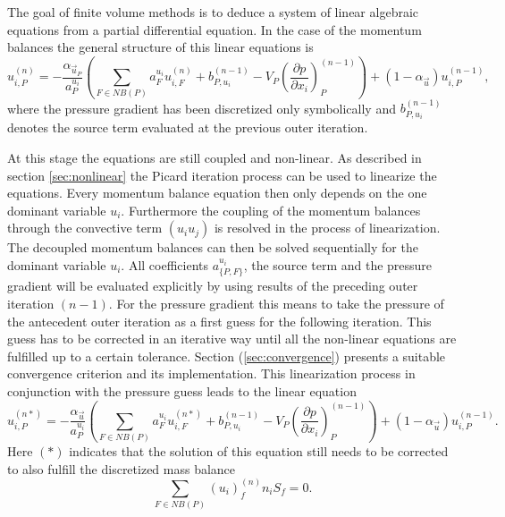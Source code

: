 The goal of finite volume methods is to deduce a system of linear algebraic equations from a partial differential equation. In the case of the momentum balances the general structure of this linear equations is
\begin{equation}
  \label{eq:linfinal}
  u_{i,P}^{(n)} 
  = 
  - \frac{\alpha_{\vec{u}_P}}{a_P^{u_i}} \left(\sum_{F \in NB(P)} a_F^{u_i} u_{i,F}^{(n)}
  +                                     b_{P,u_i}^{(n-1)} 
  -                                     V_P\left(\frac{\partial p}{\partial x_i}\right)_P^{(n-1)} \right)
  + \left(1 - \alpha_{\vec{u}}\right) u_{i,P}^{(n-1)},
\end{equation}
where the pressure gradient has been discretized only symbolically and \(b_{P,u_i}^{(n-1)}\) denotes the source term evaluated at the previous outer iteration.

At this stage the equations are still coupled and non-linear. As described in section \ref{sec:nonlinear} the Picard iteration process can be used to linearize the equations. Every momentum balance equation then only depends on the one dominant variable \(u_i\). Furthermore the coupling of the momentum balances through the convective term \((u_i u_j)\) is resolved in the process of linearization. The decoupled momentum balances can then be solved sequentially for the dominant variable \(u_i\). All coefficients \(a_{\{P,F\}}^{u_i}\), the source term and the pressure gradient will be evaluated explicitly by using results of the preceding outer iteration \((n-1)\). For the pressure gradient this means to take the pressure of the antecedent outer iteration as a first guess for the following iteration. This guess has to be corrected in an iterative way until all the non-linear equations are fulfilled up to a certain tolerance. Section (\ref{sec:convergence}) presents a suitable convergence criterion and its implementation. This linearization process in conjunction with the pressure guess leads to the linear equation 
\begin{equation}
  \label{eq:nodeinter}
  u_{i,P}^{(n*)} 
  = 
  - \frac{\alpha_{\vec{u}}}{a_P^{u_i}} \left(\sum_{F \in NB(P)} a_F^{u_i} u_{i,F}^{(n*)}
  +                                     b_{P,u_i}^{(n-1)} 
  -                                     V_P\left(\frac{\partial p}{\partial x_i}\right)_P^{(n-1)} \right)
  + \left(1 - \alpha_{\vec{u}}\right) u_{i,P}^{(n-1)}.
\end{equation}
Here \((*)\) indicates that the solution of this equation still needs to be corrected to also fulfill the discretized mass balance
\begin{equation}
  \label{eq:contisemi}
  \sum_{F \in NB(P)} (u_i)_f^{(n)} n_i S_f = 0.
\end{equation}

